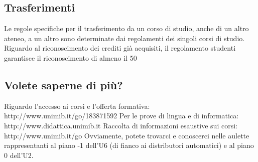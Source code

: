 \subsection{Trasferimenti}
Le regole specifiche per il trasferimento da un corso di studio, anche di un altro ateneo, a un altro sono determinate dai regolamenti dei singoli corsi di studio. Riguardo al riconoscimento dei crediti già acquisiti, il regolamento studenti garantisce il riconoscimento di almeno il 50%

\subsection{Volete saperne di più?}
Riguardo l'accesso ai corsi e l'offerta formativa: http://www.unimib.it/go/183871592 
Per le prove di lingua e di informatica: http://www.didattica.unimib.it 
Raccolta di informazioni esaustive sui corsi: http://www.unimib.it/go
Ovviamente, potete trovarci e conoscerci nelle aulette rappresentanti al piano -1 dell'U6 (di fianco ai distributori automatici) e al piano 0 dell'U2. 
